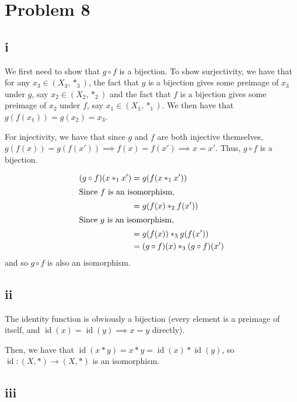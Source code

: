 \documentclass[12pt,letterpaper]{article}
\theoremstyle{definition}
\newcommand{\Z}{\mathbb{Z}}
\DeclareMathOperator{\Id}{id}
\begin{document}



\section*{Problem 8}
\subsection*{i}

We first need to show that $g \circ f$ is a bijection. To show surjectivity, we have that for any $x_3 \in (X_3, *_3)$, the fact that $g$ is a bijection gives some preimage of $x_3$ under $g$, say $x_2 \in (X_2, *_2)$ and the fact that $f$ is a bijection gives some preimage of $x_2$ under $f$, say $x_1 \in (X_1, *_1)$. We then have that $g(f(x_1)) = g(x_2) = x_3$.

For injectivity, we have that since $g$ and $f$ are both injective themselves, $g(f(x)) = g(f(x')) \implies f(x) = f(x') \implies x = x'$. Thus, $g \circ f$ is a bijection.

\begin{align*}
  (g \circ f)(x *_1 x') &= g(f(x *_1 x')) \\
  \intertext{Since $f$ is an isomorphism,}
                        &= g(f(x) *_2 f(x')) \\
                        \intertext{Since $g$ is an isomorphism,}
                        &= g(f(x)) *_3 g(f(x')) \\
                        &= (g \circ f)(x) *_3 (g \circ f)(x')
\end{align*}
and so $g \circ f$ is also an isomorphism.

\subsection*{ii}

The identity function is obviously a bijection (every element is a preimage of itself, and $\Id(x) = \Id(y) \implies x = y$ directly).

Then, we have that $\Id(x * y) = x * y = \Id(x) * \Id(y)$, so $\Id: (X, *) \rightarrow (X, *)$ is an isomorphism.

\subsection*{iii}
\end{document}

